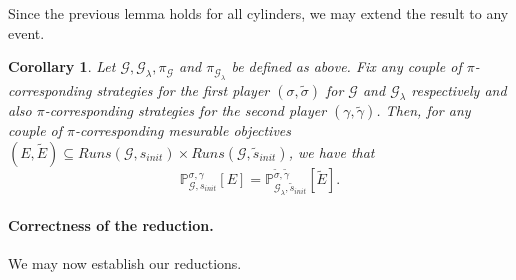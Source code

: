 \documentclass{article}
\newcommand{\IP}{\mathbb{P}}
\newcommand{\CG}{\mathcal{G}}
\theoremstyle{plain}
\newtheorem{corollary}[thm]{Corollary}
\begin{document}
Since the previous lemma holds for all cylinders, we may extend the result to any event.

\begin{corollary}
Let $\CG, \CG_{\lambda}, \pi_{\CG}$ and $\pi_{\CG_{\lambda}}$ be defined as above. Fix any couple of $\pi$-corresponding strategies for the first player $(\sigma, \tilde{\sigma})$ for $\CG$ and $\CG_{\lambda}$ respectively and also $\pi$-corresponding strategies for the second player $(\gamma, \tilde{\gamma})$. Then, for any couple of $\pi$-corresponding mesurable objectives $(E, \tilde{E}) \subseteq Runs(\CG, s_{init}) \times Runs(\CG, \tilde{s}_{init})$, we have that
$$
\IP^{\sigma, \gamma}_{\CG, s_{init}}[E] = \IP^{\tilde{\sigma}, \tilde{\gamma}}_{\CG_{\lambda}, \tilde{s}_{init}}[\tilde{E}].
$$
\end{corollary}

\paragraph{Correctness of the reduction.}
We may now establish our reductions.
\end{document}
